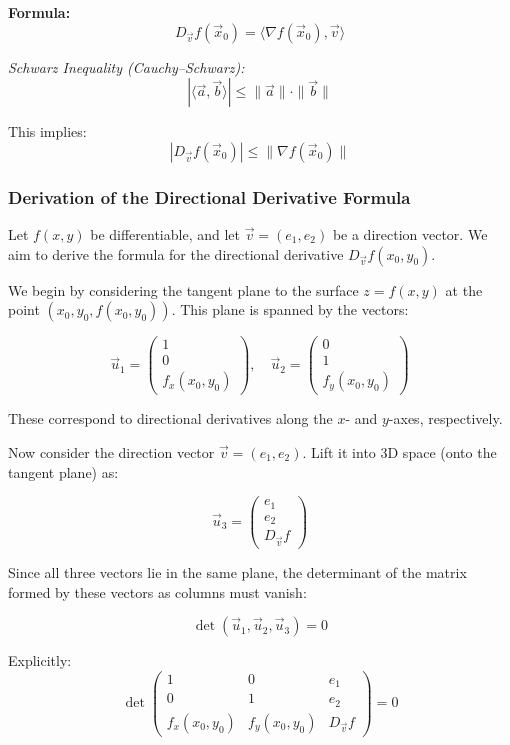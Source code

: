 \textbf{Formula:}
\[
D_{\vec{v}}f(\vec{x}_0) = \langle \nabla f(\vec{x}_0), \vec{v} \rangle
\]

\emph{Schwarz Inequality (Cauchy–Schwarz):}
\[
|\langle \vec{a}, \vec{b} \rangle| \le \|\vec{a}\| \cdot \|\vec{b}\|
\]

This implies:
\[
|D_{\vec{v}}f(\vec{x}_0)| \le \|\nabla f(\vec{x}_0)\|
\]

\subsubsection*{Derivation of the Directional Derivative Formula}

Let \( f(x, y) \) be differentiable, and let \( \vec{v} = (e_1, e_2) \) be a direction vector. We aim to derive the formula for the directional derivative \( D_{\vec{v}} f(x_0, y_0) \).

We begin by considering the tangent plane to the surface \( z = f(x, y) \) at the point \( (x_0, y_0, f(x_0, y_0)) \). This plane is spanned by the vectors:

\[
\vec{u}_1 = 
\begin{pmatrix}
1 \\
0 \\
f_x(x_0, y_0)
\end{pmatrix}, \quad
\vec{u}_2 = 
\begin{pmatrix}
0 \\
1 \\
f_y(x_0, y_0)
\end{pmatrix}
\]

These correspond to directional derivatives along the \( x \)- and \( y \)-axes, respectively.

Now consider the direction vector \( \vec{v} = (e_1, e_2) \). Lift it into 3D space (onto the tangent plane) as:

\[
\vec{u}_3 =
\begin{pmatrix}
e_1 \\
e_2 \\
D_{\vec{v}}f
\end{pmatrix}
\]

Since all three vectors lie in the same plane, the determinant of the matrix formed by these vectors as columns must vanish:

\[
\det(\vec{u}_1, \vec{u}_2, \vec{u}_3) = 0
\]

Explicitly:
\[
\det
\begin{pmatrix}
1 & 0 & e_1 \\
0 & 1 & e_2 \\
f_x(x_0, y_0) & f_y(x_0, y_0) & D_{\vec{v}}f
\end{pmatrix} = 0
\]

